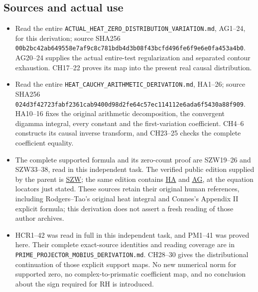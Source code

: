 \documentclass[
  10pt,
  a4paper,
]{article}
\providecommand{\tightlist}{%
  \setlength{\itemsep}{0pt}\setlength{\parskip}{0pt}}
\begin{document}
\subsection{Sources and actual use}\label{sources-and-actual-use}

\begin{itemize}
\tightlist
\item
  Read the entire
  \texttt{ACTUAL\_\allowbreak{}HEAT\_\allowbreak{}ZERO\_\allowbreak{}DISTRIBUTION\_\allowbreak{}VARIATION.\allowbreak{}md}, AG1--24, for
  this derivation; source SHA256
  \texttt{00b2bc42\allowbreak{}ab649558\allowbreak{}e7af9c8c\allowbreak{}781bdb4d\allowbreak{}3b08f43b\allowbreak{}cfd496fe\allowbreak{}6f9e6e0f\allowbreak{}a453a4b0}.
  AG20--24 supplies the actual entire-test regularization and separated
  contour exhaustion. CH17--22 proves its map into the present real
  causal distribution.
\item
  Read the entire \texttt{HEAT\_\allowbreak{}CAUCHY\_\allowbreak{}ARITHMETIC\_\allowbreak{}DERIVATION.\allowbreak{}md},
  HA1--26; source SHA256
  \texttt{024d3f42\allowbreak{}723fabf2\allowbreak{}361cab94\allowbreak{}00d98d2f\allowbreak{}e64c57ec\allowbreak{}114112e6\allowbreak{}ada6f543\allowbreak{}0a88f909}.
  HA10--16 fixes the original arithmetic decomposition, the convergent
  digamma integral, every constant and the first-variation coefficient.
  CH4--6 constructs its causal inverse transform, and CH23--25 checks
  the complete coefficient equality.
\item
  The complete supported formula and its zero-count proof are SZW19--26
  and SZW33--38, read in this independent task. The verified public
  edition supplied by the parent is
  \href{https://github.com/KokunoYumeto/zeta-function-research-reader/blob/76f421965914beb133df797835f940849844dc4f/workbenches/splitzero-tandem/branches/tau-zero-prime-positivity/SUPPORTED_ZERO_PRIME_WEIL_DERIVATION.md}{SZW};
  the same edition contains
  \href{https://github.com/KokunoYumeto/zeta-function-research-reader/blob/76f421965914beb133df797835f940849844dc4f/workbenches/splitzero-tandem/branches/tau-zero-prime-positivity/HEAT_CAUCHY_ARITHMETIC_DERIVATION.md}{HA}
  and
  \href{https://github.com/KokunoYumeto/zeta-function-research-reader/blob/76f421965914beb133df797835f940849844dc4f/workbenches/splitzero-tandem/branches/tau-zero-prime-positivity/ACTUAL_HEAT_ZERO_DISTRIBUTION_VARIATION.md}{AG},
  at the equation locators just stated. These sources retain their
  original human references, including Rodgers--Tao's original heat
  integral and Connes's Appendix II explicit formula; this derivation
  does not assert a fresh reading of those author archives.
\item
  HCR1--42 was read in full in this independent task, and PM1--41 was
  proved here. Their complete exact-source identities and reading
  coverage are in \texttt{PRIME\_\allowbreak{}PROJECTOR\_\allowbreak{}MOBIUS\_\allowbreak{}DERIVATION.\allowbreak{}md}.
  CH28--30 gives the distributional continuation of those explicit
  support maps. No new numerical norm for supported zero, no
  complex-to-prismatic coefficient map, and no conclusion about the sign
  required for RH is introduced.
\end{itemize}
\end{document}
